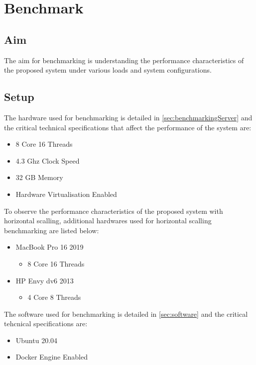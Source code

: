 \documentclass[../thesis.tex]{subfiles}
\begin{document}
\chapter{Benchmark}

\section{Aim}
The aim for benchmarking is understanding the performance characteristics of the proposed system under various loads and system configurations.

\section{Setup}

The hardware used for benchmarking is detailed in \autoref{sec:benchmarkingServer} and the critical technical specifications that affect the performance of the system are:
\begin{itemize}
	\item 8 Core 16 Threads
	\item 4.3 Ghz Clock Speed
	\item 32 GB Memory
	\item Hardware Virtualisation Enabled
\end{itemize}

To observe the performance characteristics of the proposed system with horizontal scalling, additional hardwares used for horizontal scalling benchmarking are listed below:
\begin{itemize}
	\item MacBook Pro 16 2019
		\begin{itemize}
			\item 8 Core 16 Threads
		\end{itemize}
	\item HP Envy dv6 2013
		\begin{itemize}
			\item 4 Core 8 Threads
		\end{itemize}
\end{itemize}


The software used for benchmarking is detailed in \autoref{sec:software} and the critical tehcnical specifications are:
\begin{itemize}
	\item Ubuntu 20.04
	\item Docker Engine Enabled
\end{itemize}
\end{document}
